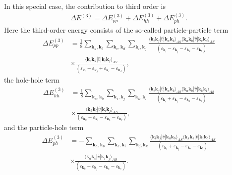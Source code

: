 \documentclass[a4paper,12pt]{report}
\begin{document}
In this special case, the contribution to third order is 
\begin{align}
  \Delta E^{(3)} = \Delta E_{pp}^{(3)} + \Delta E_{hh}^{(3)} + \Delta E_{ph}^{(3)}.
\end{align}
Here the third-order energy consists of the so-called particle-particle term 
\begin{align}
  \Delta E_{pp}^{(3)} &= \frac{1}{8} \sum_{\mathbf{k}_{a},\mathbf{k}_{b}}\sum_{\mathbf{k}_{c},\mathbf{k}_{d}}\sum_{\mathbf{k}_{i},\mathbf{k}_{j}} \frac{\langle \mathbf{k}_{i}\mathbf{k}_{j}|\hat{v}|\mathbf{k}_{a}\mathbf{k}_{b}\rangle_{AS}\langle \mathbf{k}_{a}\mathbf{k}_{b}|\hat{v}|\mathbf{k}_{c}\mathbf{k}_{d}\rangle_{AS}}{\left( \varepsilon_{\mathbf{k}_{i}}-\varepsilon_{\mathbf{k}_{j}}-\varepsilon_{\mathbf{k}_{a}}-\varepsilon_{\mathbf{k}_{b}} \right)} \nonumber \\
  & \times \frac{\langle \mathbf{k}_{c}\mathbf{k}_{d}|\hat{v}|\mathbf{k}_{i}\mathbf{k}_{j}\rangle_{AS} }{\left( \varepsilon_{\mathbf{k}_{i}}-\varepsilon_{\mathbf{k}_{j}} +\varepsilon_{\mathbf{k}_{c}}-\varepsilon_{\mathbf{k}_{d}}\right)},
  \label{eq:mbpt3_pp}
\end{align}
 the hole-hole term
\begin{align}
  \Delta E_{hh}^{(3)} &= \frac{1}{8}\sum_{\mathbf{k}_{a},\mathbf{k}_{b}}\sum_{\mathbf{k}_{i},\mathbf{k}_{j}}\sum_{\mathbf{k}_{k},\mathbf{k}_{l}}\frac{\langle \mathbf{k}_{i}\mathbf{k}_{j}|\hat{v}|\mathbf{k}_{a}\mathbf{k}_{b}\rangle_{AS}\langle \mathbf{k}_{a}\mathbf{k}_{b}|\hat{v}|\mathbf{k}_{k}\mathbf{k}_{l}\rangle_{AS}}{\left( \varepsilon_{\mathbf{k}_{i}}+\varepsilon_{\mathbf{k}_{j}}-\varepsilon_{\mathbf{k}_{a}}-\varepsilon_{\mathbf{k}_{b}}\right)} \nonumber \\
  & \times \frac{\langle \mathbf{k}_{k}\mathbf{k}_{l}|\hat{v}|\mathbf{k}_{i}\mathbf{k}_{j}\rangle_{AS} }{\left( \varepsilon_{\mathbf{k}_{k}}+\varepsilon_{\mathbf{k}_{l}}-\varepsilon_{\mathbf{k}_{a}}-\varepsilon_{\mathbf{k}_{b}}\right) },
\end{align}
and the particle-hole term
\begin{align}
  \Delta E_{ph}^{(3)} &= - \sum_{\mathbf{k}_{a},\mathbf{k}_{b}}\sum_{\mathbf{k}_{c},\mathbf{k}_{i}}\sum_{\mathbf{k}_{j},\mathbf{k}_{k}} \frac{\langle \mathbf{k}_{i}\mathbf{k}_{j}|\hat{v}|\mathbf{k}_{a}\mathbf{k}_{b}\rangle_{AS} \langle \mathbf{k}_{k}\mathbf{k}_{b}|\hat{v}|\mathbf{k}_{i}\mathbf{k}_{c}\rangle_{AS}}{\left( \varepsilon_{\mathbf{k}_{i}}+\varepsilon_{\mathbf{k}_{j}}-\varepsilon_{\mathbf{k}_{a}}-\varepsilon_{\mathbf{k}_{b}}\right)} \nonumber \\
  & \times \frac{\langle \mathbf{k}_{a}\mathbf{k}_{c}|\hat{v}|\mathbf{k}_{i}\mathbf{k}_{j}\rangle_{AS}}{\left( \varepsilon_{\mathbf{k}_{k}}+\varepsilon_{\mathbf{k}_{j}}-\varepsilon_{\mathbf{k}_{a}}-\varepsilon_{\mathbf{k}_{c}}\right)}.
\end{align}
\end{document}
